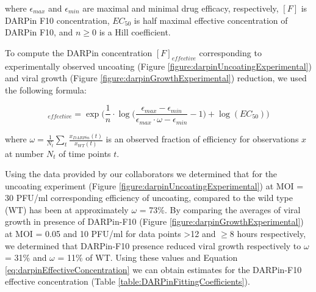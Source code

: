 where $\epsilon_{max}$ and $\epsilon_{min}$ are maximal and minimal drug efficacy, respectively, $[F]$ is DARPin F10 concentration, $EC_{50}$ is half maximal effective concentration of DARPin F10, and $n \ge 0$ is a Hill coefficient.

To compute the DARPin concentration $[F]_{effective}$ corresponding to experimentally observed uncoating (Figure \ref{figure:darpinUncoatingExperimental}) and viral growth (Figure \ref{figure:darpinGrowthExperimental}) reduction, we used the following formula:

\begin{equation}
[F]_{effective} = \exp\Big( \frac{1}{n}\cdot\log\big( \frac{\epsilon_{max}-\epsilon_{min}}{\epsilon_{max}\cdot\omega - \epsilon_{min}} - 1 \big) +\log(EC_{50}) \Big)
\label{eq:darpinEffectiveConcentration}
\end{equation}

where $\omega = \frac{1}{N_t}\sum_t \frac{x_{DARPin}(t)}{x_{WT}(t)}$ is an observed fraction of efficiency for observations $x$ at number $N_t$ of time points $t$.

Using the data \cite{DarpinData} provided by our collaborators we determined that for the uncoating experiment (Figure \ref{figure:darpinUncoatingExperimental}) at MOI = 30 PFU/ml corresponding efficiency of uncoating, compared to the wild type (WT) has been at approximately $\omega$ = 73\%. By comparing the averages of viral growth in presence of DARPin-F10 (Figure \ref{figure:darpinGrowthExperimental}) at MOI = 0.05 and 10 PFU/ml for data points >12 and $\ge$8 hours respectively, we determined that DARPin-F10 presence reduced viral growth respectively to $\omega$ = 31\% and $\omega$ = 11\% of WT. Using these values and Equation \ref{eq:darpinEffectiveConcentration} we can obtain estimates for the DARPin-F10 effective concentration (Table \ref{table:DARPinFittingCoefficients}).


